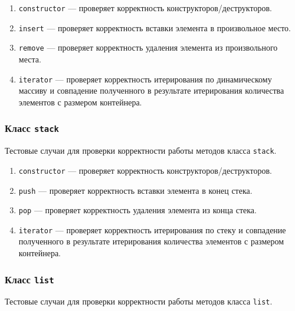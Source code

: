 \documentclass[a4paper,12pt]{article}
\begin{document}
\begin{enumerate}

\item
\verb!constructor! — проверяет корректность конструкторов/деструкторов.

\item
\verb!insert! — проверяет корректность вставки элемента в произвольное место.

\item
\verb!remove! — проверяет корректность удаления элемента из произвольного места.

\item
\verb!iterator! — проверяет корректность итерирования по динамическому массиву и совпадение полученного в результате итерирования количества элементов с размером контейнера.

\end{enumerate}

\subsubsection{Класс {\tt stack}}

Тестовые случаи для проверки корректности работы методов класса {\tt stack}.

\begin{enumerate}

\item
\verb!constructor! — проверяет корректность конструкторов/деструкторов.

\item
\verb!push! — проверяет корректность вставки элемента в конец стека.

\item
\verb!pop! — проверяет корректность удаления элемента из конца стека.

\item
\verb!iterator! — проверяет корректность итерирования по стеку и совпадение полученного в результате итерирования количества элементов с размером контейнера.

\end{enumerate}

\subsubsection{Класс {\tt list}}

Тестовые случаи для проверки корректности работы методов класса {\tt list}.
\end{document}
